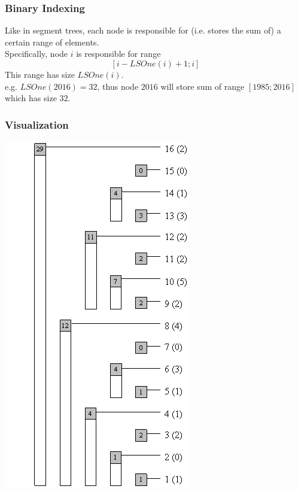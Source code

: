 \documentclass[12pt]{beamer}
\newcommand{\blank}{\vspace{.5cm}}
\begin{document}
\begin{frame}
    \frametitle{Binary Indexing}
    Like in segment trees, each node is responsible for
    (i.e. stores the sum of) a certain range of elements. \\\blank
    Specifically, node $i$ is responsible for range
    \[ [ i - LSOne(i) + 1;  i ] \]
    This range has size $LSOne(i)$. \\\blank
    e.g. $LSOne(2016) = 32$, thus node $2016$ will store sum of range
    $[1985; 2016]$ which has size $32$.
\end{frame}

\begin{frame}
    \frametitle{Visualization}
    \begin{center}
        \includegraphics[width=\linewidth,height=.8\textheight,keepaspectratio]{img/tree}
    \end{center}
\end{frame}
\end{document}
